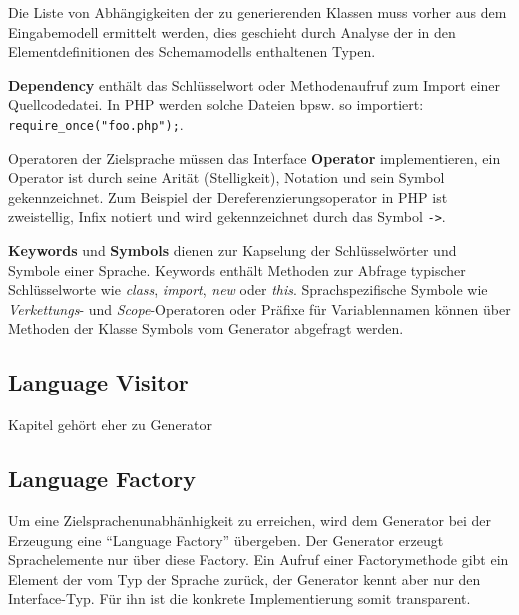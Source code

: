 Die Liste von Abhängigkeiten der zu generierenden Klassen muss vorher aus dem Eingabemodell ermittelt werden, dies geschieht durch Analyse der in den Elementdefinitionen des Schemamodells enthaltenen Typen. 

\textbf{Dependency} enthält das Schlüsselwort oder Methodenaufruf zum Import einer Quellcodedatei. In PHP werden solche Dateien bpsw. so importiert: \texttt{require\_once("foo.php");}.

Operatoren der Zielsprache müssen das Interface \textbf{Operator} implementieren, ein Operator ist durch seine Arität (Stelligkeit), Notation und sein Symbol gekennzeichnet. Zum Beispiel der Dereferenzierungsoperator in PHP ist zweistellig, Infix notiert und wird gekennzeichnet durch das Symbol \texttt{->}.

\textbf{Keywords} und \textbf{Symbols} dienen zur Kapselung der Schlüsselwörter und Symbole einer Sprache. Keywords enthält Methoden zur Abfrage typischer Schlüsselworte wie \emph{class}, \emph{import}, \emph{new} oder \emph{this}. Sprachspezifische Symbole wie \emph{Verkettungs}- und \emph{Scope}-Operatoren oder Präfixe für Variablennamen können über Methoden der Klasse Symbols vom Generator abgefragt werden.

\subsection{Language Visitor}
\label{sec:language_visitor}

Kapitel gehört eher zu Generator

\subsection{Language Factory}
\label{sec:language_factory}

Um eine Zielsprachenunabhänhigkeit zu erreichen, wird dem Generator bei der Erzeugung eine \enquote{Language Factory} übergeben. Der Generator erzeugt Sprachelemente nur über diese Factory. Ein Aufruf einer Factorymethode gibt ein Element der vom Typ der Sprache zurück, der Generator kennt aber nur den Interface-Typ. Für ihn ist die konkrete Implementierung somit transparent.
